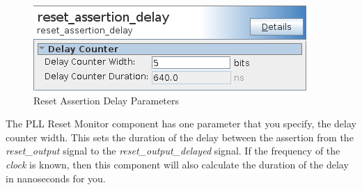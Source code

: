 \documentclass{article}
\begin{document}
\begin{flushleft}
\begin{figure}[H]
\centering
\includegraphics[scale=0.675]{rad_parameters}
\caption{Reset Assertion Delay Parameters}
\label{fig:rad_parameters}
\end{figure}

The PLL Reset Monitor component has one parameter that you specify, the delay counter width.  This sets the duration of the delay between the assertion from the \emph{reset\_output} signal to the \emph{reset\_output\_delayed} signal.  If the frequency of the \emph{clock} is known, then this component will also calculate the duration of the delay in nanoseconds for you.

\end{flushleft}

\end{document}
